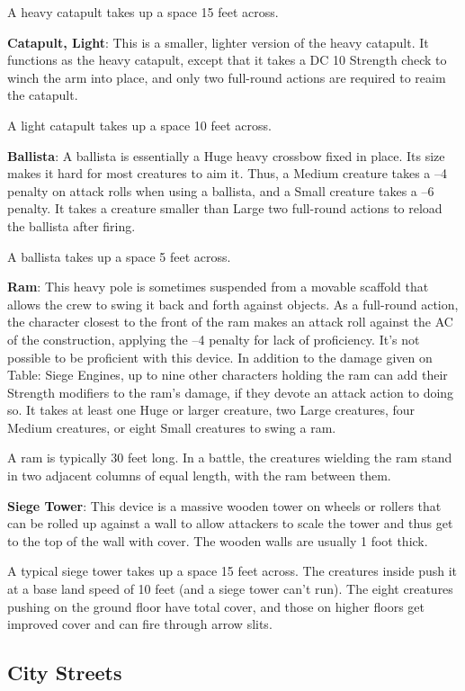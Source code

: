A heavy catapult takes up a space 15 feet across.
				
\textbf{Catapult, Light}: This is a smaller, lighter version of the heavy catapult. It functions as the heavy catapult, except that it takes a DC 10 Strength check to winch the arm into place, and only two full-round actions are required to reaim the catapult.
				
A light catapult takes up a space 10 feet across.
								
\textbf{Ballista}: A ballista is essentially a Huge heavy crossbow fixed in place. Its size makes it hard for most creatures to aim it\textit{. }Thus, a Medium creature takes a --4 penalty on attack rolls when using a ballista, and a Small creature takes a --6 penalty. It takes a creature smaller than Large two full-round actions to reload the ballista after firing.
				
A ballista takes up a space 5 feet across.
				
\textbf{Ram}: This heavy pole is sometimes suspended from a movable scaffold that allows the crew to swing it back and forth against objects. As a full-round action, the character closest to the front of the ram makes an attack roll against the AC of the construction, applying the --4 penalty for lack of proficiency. It's not possible to be proficient with this device. In addition to the damage given on Table: Siege Engines, up to nine other characters holding the ram can add their Strength modifiers to the ram's damage, if they devote an attack action to doing so. It takes at least one Huge or larger creature, two Large creatures, four Medium creatures, or eight Small creatures to swing a ram.
				
A ram is typically 30 feet long. In a battle, the creatures wielding the ram stand in two adjacent columns of equal length, with the ram between them.
				
\textbf{Siege Tower}: This device is a massive wooden tower on wheels or rollers that can be rolled up against a wall to allow attackers to scale the tower and thus get to the top of the wall with cover. The wooden walls are usually 1 foot thick.
				
A typical siege tower takes up a space 15 feet across. The creatures inside push it at a base land speed of 10 feet (and a siege tower can't run). The eight creatures pushing on the ground floor have total cover, and those on higher floors get improved cover and can fire through arrow slits.
				
\subsection{City Streets}

